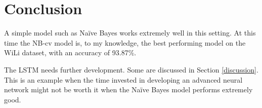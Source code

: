 \documentclass[conference]{IEEEtran}
\begin{document}
%






\section{Conclusion}
A simple model such as Naïve Bayes works extremely well in this setting. At this time the NB-cv model is, to my knowledge, the best performing model on the WiLi dataset, with an accuracy of 93.87\%.

The LSTM needs further development. Some are discussed in Section \ref{discussion}. This is an example when the time invested in developing an advanced neural network might not be worth it when the Naïve Bayes model performs extremely good.
\end{document}
